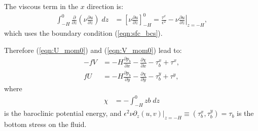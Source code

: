 \documentclass[10pt]{amsart}
\begin{document}
 The viscous term in the $x$ direction is:
 \begin{align}
  \int_{-H}^{0} \frac{\partial}{\partial z} \left( \nu \frac{\partial u}{\partial z} \right) \; dz & = \left[  \nu \frac{\partial u}{\partial z}  \right]_{-H}^{0}  = \frac{\tau^x}{ \epsilon^2}  - \left. \nu \frac{\partial u}{\partial z} \right|_{z = -H} ,
 \end{align}
which uses the boundary condition (\ref{eqn:sfc_bcs}).
  
 Therefore (\ref{eqn:U_mom0}) and (\ref{eqn:V_mom0}) lead to:
 \begin{align}
- f V & =  - H \frac{\partial p_b}{\partial x} - \frac{\partial \chi}{\partial x}  - \tau^x_b + \tau^x , \label{eqn:U_mom} \\
f  U & = - H \frac{\partial p_b}{\partial y} - \frac{\partial \chi }{\partial y}  - \tau^y_b + \tau^y \label{eqn:V_mom} ,
\end{align}
where
\begin{align}
\chi & = - \int_{-H}^0 z b \; dz
\label{eqn:baroclinic_PE}
\end{align}
is the baroclinic potential energy, and $\epsilon^2  \nu \left. \partial_z (u,v) \right|_{z = -H}  \equiv (\tau^x_b, \tau^y_b) = \tau_b$ is the bottom stress on the fluid.
\end{document}
